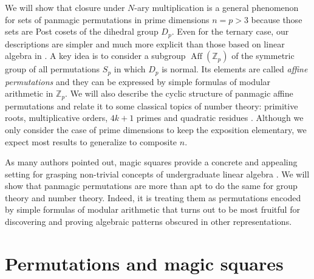 \documentclass[11pt]{article}
\theoremstyle{plain}
\theoremstyle{definition}
\newcommand{\+}[1]{{#1}^\times}
\def\Aff{\operatorname{Aff}}
\def\Z{{\mathbb Z}}
\begin{document}
We will show that closure under $N$-ary multiplication is a general phenomenon for sets of panmagic permutations in prime dimensions $n=p>3$ because those sets are Post cosets of the dihedral group $D_p$. Even for the ternary case, our descriptions are simpler and much more explicit than those based on linear algebra in \cite{Nord}. A key idea is to consider a subgroup $\Aff(\Z_p)$ of the symmetric group of all permutations $S_p$ in which $D_p$ is normal. Its elements are called {\it affine permutations} and they can be expressed by simple formulas of modular arithmetic in $\Z_p$. We will also describe the cyclic structure of panmagic affine permutations and relate it to some classical topics of number theory: primitive roots, multiplicative orders, $4k+1$ primes and quadratic residues \cite{IrRos,Rosen}. Although we only consider the case of prime dimensions to keep the exposition elementary, we expect most results to generalize to composite $n$.

As many authors pointed out, magic squares provide a concrete and appealing setting for grasping non-trivial concepts of undergraduate linear algebra \cite{Ess,Mat,Thom}. We will show that panmagic permutations are more than apt to do the same for group theory and number theory. Indeed, it is treating them as permutations encoded by simple formulas of modular arithmetic that turns out to be most fruitful for discovering and proving algebraic patterns obscured in other representations. 


\section{Permutations and magic squares}
\end{document}
